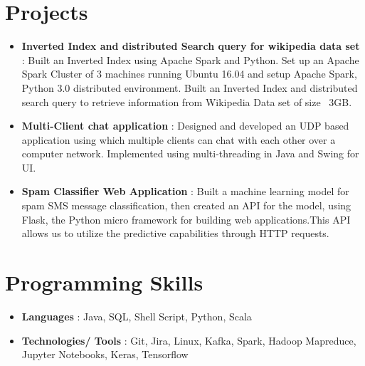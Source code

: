 \documentclass[letterpaper,11pt]{article}
\newcommand{\resumeItem}[2]{
  \item\small{
    \textbf{#1}{: #2 \vspace{-2pt}}
  }
}
\newcommand{\resumeSubItem}[2]{\resumeItem{#1}{#2}\vspace{-4pt}}
\newcommand{\resumeSubHeadingListStart}{\begin{itemize}[leftmargin=*]}
\newcommand{\resumeSubHeadingListEnd}{\end{itemize}}
\begin{document}
\section{Projects}
  \resumeSubHeadingListStart
    \resumeSubItem{Inverted Index and distributed Search query for wikipedia data set }
      {Built an Inverted Index using Apache Spark and Python.
Set up an Apache Spark Cluster of 3 machines running Ubuntu 16.04 and setup Apache Spark, Python 3.0 distributed environment.
Built an Inverted Index and distributed search query to retrieve information from Wikipedia Data set of size ~3GB.}
\resumeSubItem{Multi-Client chat application }
      {Designed and developed an UDP based application using which multiple clients can chat with each other over a computer network. Implemented using multi-threading in Java and Swing for UI.}

    \resumeSubItem{Spam Classifier Web Application }
      {Built a machine learning model for spam SMS message classification, then created an API for the model, using Flask, the Python micro framework for building web applications.This API allows us to utilize the predictive capabilities through HTTP requests.}

  \resumeSubHeadingListEnd


\section{Programming Skills}
  \resumeSubHeadingListStart
    \resumeSubItem{Languages }{Java, SQL, Shell Script, Python, Scala}
    \resumeSubItem{Technologies/ Tools }{Git, Jira, Linux, Kafka, Spark, Hadoop Mapreduce, Jupyter Notebooks, Keras, Tensorflow}
  \resumeSubHeadingListEnd


\end{document}
